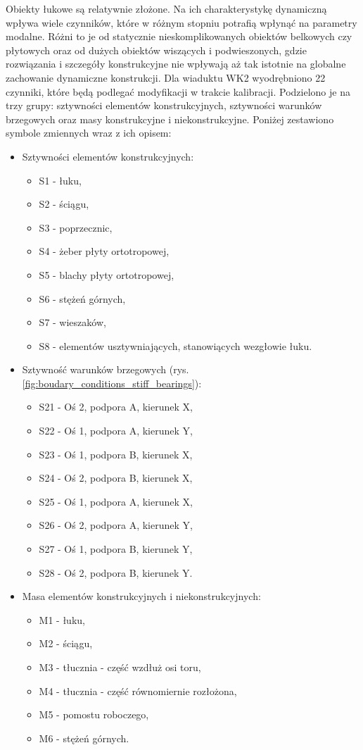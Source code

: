 Obiekty łukowe są relatywnie złożone. Na ich charakterystykę dynamiczną wpływa wiele czynników, które w różnym stopniu potrafią wpłynąć na parametry modalne. Różni to je od statycznie nieskomplikowanych obiektów belkowych czy płytowych oraz od dużych obiektów wiszących i podwieszonych, gdzie rozwiązania i szczegóły konstrukcyjne nie wpływają aż tak istotnie na globalne zachowanie dynamiczne konstrukcji. Dla wiaduktu WK2 wyodrębniono 22 czynniki, które będą podlegać modyfikacji w trakcie kalibracji. Podzielono je na trzy grupy: sztywności elementów konstrukcyjnych, sztywności warunków brzegowych oraz masy konstrukcyjne i niekonstrukcyjne. Poniżej zestawiono symbole zmiennych wraz z ich opisem:
\begin{itemize}
	\item Sztywności elementów konstrukcyjnych:
	\begin{itemize}
		\item S1 - łuku,
		\item S2 - ściągu,
		\item S3 - poprzecznic,
		\item S4 - żeber płyty ortotropowej,
		\item S5 - blachy płyty ortotropowej,
		\item S6 - stężeń górnych,
		\item S7 - wieszaków,
		\item S8 - elementów usztywniających, stanowiących wezgłowie łuku.
	\end{itemize}
	\item Sztywność warunków brzegowych (rys. \ref{fig:boudary_conditions_stiff_bearings}):
	\begin{itemize}
		\item S21 - Oś 2, podpora A, kierunek X,
		\item S22 - Oś 1, podpora A, kierunek Y,
		\item S23 - Oś 1, podpora B, kierunek X,
		\item S24 - Oś 2, podpora B, kierunek X,
		\item S25 - Oś 1, podpora A, kierunek X,
		\item S26 - Oś 2, podpora A, kierunek Y,
		\item S27 - Oś 1, podpora B, kierunek Y,
		\item S28 - Oś 2, podpora B, kierunek Y.
	\end{itemize}
	\item Masa elementów konstrukcyjnych i niekonstrukcyjnych:
	\begin{itemize}
		\item M1 - łuku,
		\item M2 - ściągu,
		\item M3 - tłucznia - część wzdłuż osi toru,
		\item M4 - tłucznia - część równomiernie rozłożona,
		\item M5 - pomostu roboczego,
		\item M6 - stężeń górnych.
	\end{itemize}
\end{itemize}

